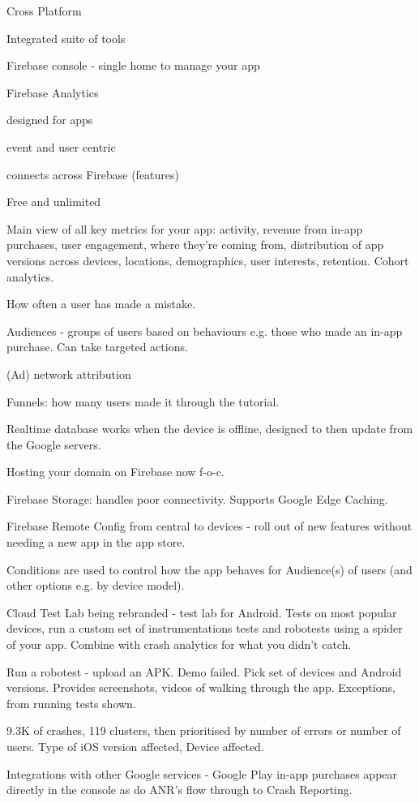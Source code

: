 Cross Platform

Integrated suite of tools

Firebase console - single home to manage your app

Firebase Analytics

designed for apps

event and user centric

connects across Firebase (features)

Free and unlimited

Main view of all key metrics for your app: activity, revenue from in-app purchases, user engagement, where they’re coming from, distribution of app versions across devices, locations, demographics, user interests, retention. Cohort analytics.

How often a user has made a mistake.

Audiences - groups of users based on behaviours e.g. those who made an in-app purchase. Can take targeted actions.

(Ad) network attribution

Funnels: how many users made it through the tutorial.

Realtime database works when the device is offline, designed to then update from the Google servers.

Hosting your domain on Firebase now f-o-c.

Firebase Storage: handles poor connectivity. Supports Google Edge Caching.

Firebase Remote Config from central to devices - roll out of new features without needing a new app in the app store.

Conditions are used to control how the app behaves for Audience(s) of users (and other options e.g. by device model).

Cloud Test Lab being rebranded - test lab for Android. Tests on most popular devices, run a custom set of instrumentations tests and robotests using a spider of your app. Combine with crash analytics for what you didn’t catch. 

Run a robotest - upload an APK. Demo failed. Pick set of devices and Android versions. Provides screenshots, videos of walking through the app. Exceptions, from running tests shown. 

9.3K of crashes, 119 clusters, then prioritised by number of errors or number of users. Type of iOS version affected, Device affected. 

Integrations with other Google services - Google Play in-app purchases appear directly in the console as do ANR’s flow through to Crash Reporting.


